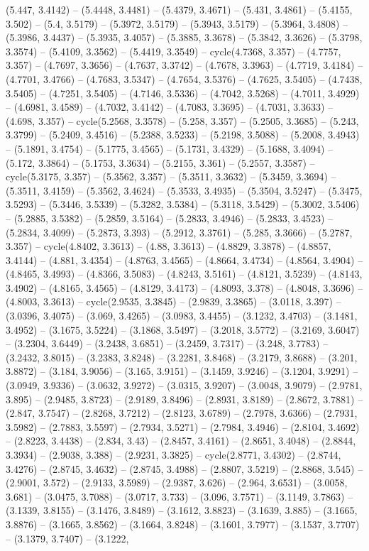 (5.447, 3.4142) -- (5.4448, 3.4481) -- (5.4379, 3.4671) -- (5.431, 3.4861) -- (5.4155, 3.502) -- (5.4, 3.5179) -- (5.3972, 3.5179) -- (5.3943, 3.5179) -- (5.3964, 3.4808) -- (5.3986, 3.4437) -- (5.3935, 3.4057) -- (5.3885, 3.3678) -- (5.3842, 3.3626) -- (5.3798, 3.3574) -- (5.4109, 3.3562) -- (5.4419, 3.3549) -- cycle(4.7368, 3.357) -- (4.7757, 3.357) -- (4.7697, 3.3656) -- (4.7637, 3.3742) -- (4.7678, 3.3963) -- (4.7719, 3.4184) -- (4.7701, 3.4766) -- (4.7683, 3.5347) -- (4.7654, 3.5376) -- (4.7625, 3.5405) -- (4.7438, 3.5405) -- (4.7251, 3.5405) -- (4.7146, 3.5336) -- (4.7042, 3.5268) -- (4.7011, 3.4929) -- (4.6981, 3.4589) -- (4.7032, 3.4142) -- (4.7083, 3.3695) -- (4.7031, 3.3633) -- (4.698, 3.357) -- cycle(5.2568, 3.3578) -- (5.258, 3.357) -- (5.2505, 3.3685) -- (5.243, 3.3799) -- (5.2409, 3.4516) -- (5.2388, 3.5233) -- (5.2198, 3.5088) -- (5.2008, 3.4943) -- (5.1891, 3.4754) -- (5.1775, 3.4565) -- (5.1731, 3.4329) -- (5.1688, 3.4094) -- (5.172, 3.3864) -- (5.1753, 3.3634) -- (5.2155, 3.361) -- (5.2557, 3.3587) -- cycle(5.3175, 3.357) -- (5.3562, 3.357) -- (5.3511, 3.3632) -- (5.3459, 3.3694) -- (5.3511, 3.4159) -- (5.3562, 3.4624) -- (5.3533, 3.4935) -- (5.3504, 3.5247) -- (5.3475, 3.5293) -- (5.3446, 3.5339) -- (5.3282, 3.5384) -- (5.3118, 3.5429) -- (5.3002, 3.5406) -- (5.2885, 3.5382) -- (5.2859, 3.5164) -- (5.2833, 3.4946) -- (5.2833, 3.4523) -- (5.2834, 3.4099) -- (5.2873, 3.393) -- (5.2912, 3.3761) -- (5.285, 3.3666) -- (5.2787, 3.357) -- cycle(4.8402, 3.3613) -- (4.88, 3.3613) -- (4.8829, 3.3878) -- (4.8857, 3.4144) -- (4.881, 3.4354) -- (4.8763, 3.4565) -- (4.8664, 3.4734) -- (4.8564, 3.4904) -- (4.8465, 3.4993) -- (4.8366, 3.5083) -- (4.8243, 3.5161) -- (4.8121, 3.5239) -- (4.8143, 3.4902) -- (4.8165, 3.4565) -- (4.8129, 3.4173) -- (4.8093, 3.378) -- (4.8048, 3.3696) -- (4.8003, 3.3613) -- cycle(2.9535, 3.3845) -- (2.9839, 3.3865) -- (3.0118, 3.397) -- (3.0396, 3.4075) -- (3.069, 3.4265) -- (3.0983, 3.4455) -- (3.1232, 3.4703) -- (3.1481, 3.4952) -- (3.1675, 3.5224) -- (3.1868, 3.5497) -- (3.2018, 3.5772) -- (3.2169, 3.6047) -- (3.2304, 3.6449) -- (3.2438, 3.6851) -- (3.2459, 3.7317) -- (3.248, 3.7783) -- (3.2432, 3.8015) -- (3.2383, 3.8248) -- (3.2281, 3.8468) -- (3.2179, 3.8688) -- (3.201, 3.8872) -- (3.184, 3.9056) -- (3.165, 3.9151) -- (3.1459, 3.9246) -- (3.1204, 3.9291) -- (3.0949, 3.9336) -- (3.0632, 3.9272) -- (3.0315, 3.9207) -- (3.0048, 3.9079) -- (2.9781, 3.895) -- (2.9485, 3.8723) -- (2.9189, 3.8496) -- (2.8931, 3.8189) -- (2.8672, 3.7881) -- (2.847, 3.7547) -- (2.8268, 3.7212) -- (2.8123, 3.6789) -- (2.7978, 3.6366) -- (2.7931, 3.5982) -- (2.7883, 3.5597) -- (2.7934, 3.5271) -- (2.7984, 3.4946) -- (2.8104, 3.4692) -- (2.8223, 3.4438) -- (2.834, 3.43) -- (2.8457, 3.4161) -- (2.8651, 3.4048) -- (2.8844, 3.3934) -- (2.9038, 3.388) -- (2.9231, 3.3825) -- cycle(2.8771, 3.4302) -- (2.8744, 3.4276) -- (2.8745, 3.4632) -- (2.8745, 3.4988) -- (2.8807, 3.5219) -- (2.8868, 3.545) -- (2.9001, 3.572) -- (2.9133, 3.5989) -- (2.9387, 3.626) -- (2.964, 3.6531) -- (3.0058, 3.681) -- (3.0475, 3.7088) -- (3.0717, 3.733) -- (3.096, 3.7571) -- (3.1149, 3.7863) -- (3.1339, 3.8155) -- (3.1476, 3.8489) -- (3.1612, 3.8823) -- (3.1639, 3.885) -- (3.1665, 3.8876) -- (3.1665, 3.8562) -- (3.1664, 3.8248) -- (3.1601, 3.7977) -- (3.1537, 3.7707) -- (3.1379, 3.7407) -- (3.1222, 